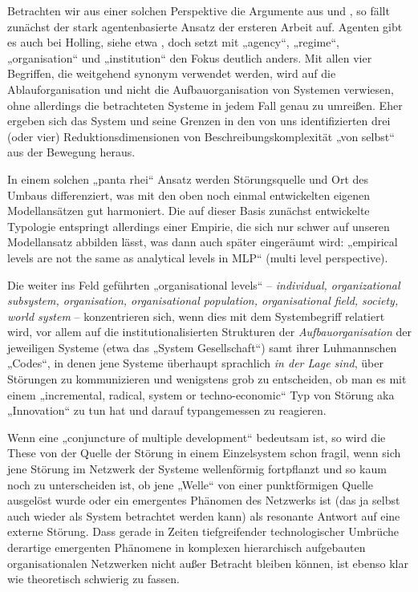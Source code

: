 \documentclass[11pt,a4paper]{article}
\begin{document}
Betrachten wir aus einer solchen Perspektive die Argumente aus
\cite{Geels2007} und \cite{Holling2000}, so fällt zunächst der stark
agentenbasierte Ansatz der ersteren Arbeit auf. Agenten gibt es auch bei
Holling, siehe etwa \cite[Tab. 2]{Holling2000}, doch setzt \cite{Geels2007}
mit „agency“, „regime“, „organisation“ und „institution“ den Fokus deutlich
anders. Mit allen vier Begriffen, die weitgehend synonym verwendet werden,
wird auf die Ablauforganisation und nicht die Aufbauorganisation von Systemen
verwiesen, ohne allerdings die betrachteten Systeme in jedem Fall genau zu
umreißen. Eher ergeben sich das System und seine Grenzen in den von uns
identifizierten drei (oder vier) Reduktionsdimensionen von
Beschreibungskomplexität „von selbst“ aus der Bewegung heraus.

In einem solchen „panta rhei“ Ansatz werden \cite[S. 401]{Geels2007}
Störungsquelle und Ort des Umbaus differenziert, was mit den oben noch einmal
entwickelten eigenen Modellansätzen gut harmoniert. Die auf dieser Basis
zunächst entwickelte Typologie \cite[Fig. 2]{Geels2007} entspringt allerdings
einer Empirie, die sich nur schwer auf unseren Modellansatz abbilden lässt,
was dann auch später \cite[S. 402]{Geels2007} eingeräumt wird: „empirical
levels are not the same as analytical levels in MLP“ (multi level
perspective).

Die weiter ins Feld geführten „organisational levels“ -- \emph{individual,
  organizational subsystem, organisation, organisational population,
  organisational field, society, world system} -- konzentrieren sich, wenn
dies mit dem Systembegriff relatiert wird, vor allem auf die
institutionalisierten Strukturen der \emph{Aufbauorganisation} der jeweiligen
Systeme (etwa das „System Gesellschaft“) samt ihrer Luhmannschen „Codes“, in
denen jene Systeme überhaupt sprachlich \emph{in der Lage sind}, über
Störungen zu kommunizieren und wenigstens grob zu entscheiden, ob man es mit
einem „incremental, radical, system or techno-economic“ Typ von Störung aka
„Innovation“ zu tun hat und darauf typangemessen zu reagieren.

Wenn eine „conjuncture of multiple development“ \cite[3.2.]{Geels2007}
bedeutsam ist, so wird die These von der Quelle der Störung in einem
Einzelsystem schon fragil, wenn sich jene Störung im Netzwerk der Systeme
wellenförmig fortpflanzt und so kaum noch zu unterscheiden ist, ob jene
„Welle“ von einer punktförmigen Quelle ausgelöst wurde oder ein emergentes
Phänomen des Netzwerks ist (das ja selbst auch wieder als System betrachtet
werden kann) als resonante Antwort auf eine externe Störung. Dass gerade in
Zeiten tiefgreifender technologischer Umbrüche derartige emergenten Phänomene
in komplexen hierarchisch aufgebauten organisationalen Netzwerken nicht außer
Betracht bleiben können, ist ebenso klar wie theoretisch schwierig zu fassen.
\end{document}
